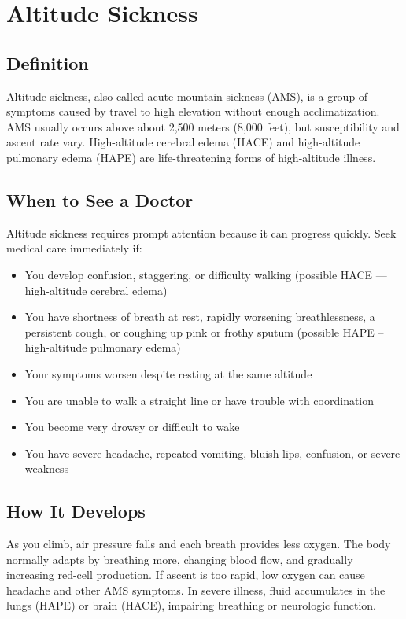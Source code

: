 \chapter{Altitude Sickness}

\section*{Definition}
Altitude sickness, also called acute mountain sickness (AMS), is a group of symptoms caused by travel to high elevation without enough acclimatization. AMS usually occurs above about 2,500 meters (8,000 feet), but susceptibility and ascent rate vary. High-altitude cerebral edema (HACE) and high-altitude pulmonary edema (HAPE) are life-threatening forms of high-altitude illness.

\section*{When to See a Doctor}
Altitude sickness requires prompt attention because it can progress quickly. Seek medical care immediately if:
\begin{itemize}
  \item You develop confusion, staggering, or difficulty walking (possible HACE — high-altitude cerebral edema)
  \item You have shortness of breath at rest, rapidly worsening breathlessness, a persistent cough, or coughing up pink or frothy sputum (possible HAPE -- high-altitude pulmonary edema)
  \item Your symptoms worsen despite resting at the same altitude
  \item You are unable to walk a straight line or have trouble with coordination
  \item You become very drowsy or difficult to wake
  \item You have severe headache, repeated vomiting, bluish lips, confusion, or severe weakness
\end{itemize}

\section*{How It Develops}
As you climb, air pressure falls and each breath provides less oxygen. The body normally adapts by breathing more, changing blood flow, and gradually increasing red-cell production. If ascent is too rapid, low oxygen can cause headache and other AMS symptoms. In severe illness, fluid accumulates in the lungs (HAPE) or brain (HACE), impairing breathing or neurologic function.

